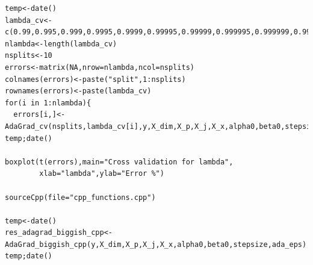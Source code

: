 \documentclass{article}
\begin{document}
\begin{lstlisting}
temp<-date()
lambda_cv<-c(0.99,0.995,0.999,0.9995,0.9999,0.99995,0.99999,0.999995,0.999999,0.9999995,0.9999999)
nlambda<-length(lambda_cv)
nsplits<-10
errors<-matrix(NA,nrow=nlambda,ncol=nsplits)
colnames(errors)<-paste("split",1:nsplits)
rownames(errors)<-paste(lambda_cv)
for(i in 1:nlambda){
  errors[i,]<-AdaGrad_cv(nsplits,lambda_cv[i],y,X_dim,X_p,X_j,X_x,alpha0,beta0,stepsize,ada_eps)}
temp;date()

boxplot(t(errors),main="Cross validation for lambda",
        xlab="lambda",ylab="Error %")

sourceCpp(file="cpp_functions.cpp")

temp<-date()
res_adagrad_biggish_cpp<-AdaGrad_biggish_cpp(y,X_dim,X_p,X_j,X_x,alpha0,beta0,stepsize,ada_eps)
temp;date()
\end{lstlisting}
\end{document}
